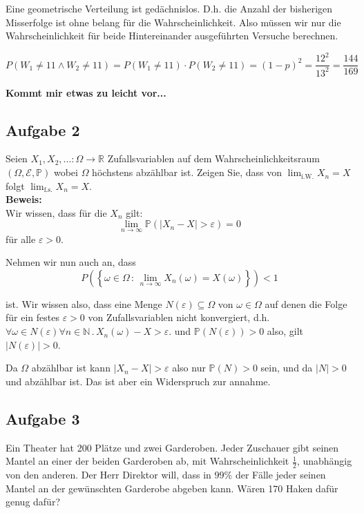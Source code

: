 \documentclass[11pt,a4paper,ngerman]{article}
\newcommand{\Prob}{\mathbb{P}}
\begin{document}
Eine geometrische Verteilung ist gedächnislos. D.h. die Anzahl der bisherigen
Misserfolge ist ohne belang für die Wahrscheinlichkeit. Also müssen wir
nur die Wahrscheinlichkeit für beide Hintereinander ausgeführten Versuche berechnen.

\[
    P(W_1 \not= 11 \land W_2 \not=11) = P(W_1 \not= 11) \cdot P(W_2 \not= 11) =
        (1-p)^2 = \frac{12^2}{13^2} = \frac{144}{169}
\]

\textbf{Kommt mir etwas zu leicht vor...}

\subsection*{Aufgabe 2}

Seien $X_1, X_2, ... : \Omega \rightarrow \mathbb{R}$ Zufallsvariablen auf dem Wahrscheinlichkeitsraum $\left( \Omega, \mathcal{E}, \Prob \right)$ wobei $\Omega$
höchstens abzählbar ist. Zeigen Sie, dass von $\lim_{\text{i.W.}} X_n = X$ folgt $\lim_{\text{f.s.}} X_n = X$.\\

\textbf{Beweis:}\\

Wir wissen, dass für die $X_n$ gilt:
\[
    \lim_{n \rightarrow \infty} \Prob(\left| X_n - X \right| > \varepsilon) = 0
\]
für alle $\varepsilon > 0$.

Nehmen wir nun auch an, dass
\[
    P(\left\{ \omega \in \Omega \, : \, \lim_{n \rightarrow \infty} X_n(\omega) = X(\omega) \right\}) < 1
\]

ist. Wir wissen also, dass eine Menge $N(\varepsilon) \subseteq \Omega$ von $\omega \in \Omega$ auf denen die Folge für ein festes $\varepsilon > 0$ 
von Zufallsvariablen nicht konvergiert, d.h. $\forall \omega \in N(\varepsilon) \forall n \in \mathbb{N} \, . \, X_n(\omega) - X > \varepsilon$.
und $\Prob(N(\varepsilon)) > 0$ also, gilt $|N(\varepsilon)| > 0$. 

Da $\Omega$ abzählbar ist kann $|X_n - X| > \varepsilon$ also nur $\Prob(N) > 0$ sein, und da $|N| > 0$ und abzählbar ist. Das ist aber ein Widerspruch zur annahme.

\subsection*{Aufgabe 3}

Ein Theater hat 200 Plätze und zwei Garderoben. Jeder Zuschauer gibt seinen Mantel an einer der beiden Garderoben ab, mit Wahrscheinlichkeit $\frac{1}{2}$, unabhängig
von den anderen. Der Herr Direktor will, dass in $99\%$ der Fälle jeder seinen Mantel an der gewünschten Garderobe abgeben kann. Wären 170 Haken dafür genug dafür?\\
\end{document}

